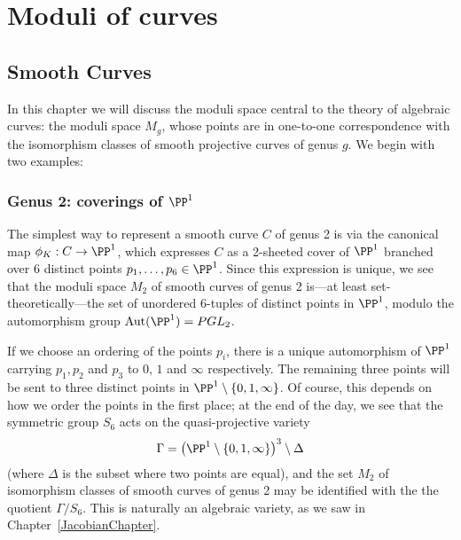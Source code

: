 


\chapter{Moduli of curves} 
\label{CurvesModuli chapter}\label{CurvesModuliChapter}

\section{Smooth Curves}

In this chapter we will discuss the moduli space central to the theory of algebraic curves: the moduli space $M_g$, whose points are in one-to-one correspondence with the isomorphism classes of smooth projective
curves of genus $g$. We begin with two examples:


\subsection{Genus 2: coverings of $\PP^1$}                                                                                             

 The simplest way to represent a smooth curve $C$ of genus 2 is via the canonical map $\phi_K : C \to \PP^1$, which expresses $C$ as a 2-sheeted cover of $\PP^1$ branched over 6 distinct points $p_1,\dots,p_6 \in \PP^1$. Since this expression is unique, we see that the moduli space $M_2$ of smooth curves of genus 2 is---at least set-theoretically---the set of unordered 6-tuples of distinct points in $\PP^1$, modulo the automorphism group ${\rm Aut}(\PP^1) = PGL_2$.

 If we choose an ordering of the points $p_i$, there is a unique automorphism of $\PP^1$ carrying $p_1, p_2$ and $p_3$ to $0$, $1$ and $\infty$ respectively.  The remaining three points will be sent to three distinct points in $\PP^1 \setminus \{0, 1, \infty \} $. Of course, this depends on how we order the points in the first place; at the end of the day, we see that the symmetric group $S_6$ acts on the quasi-projective variety
$$
\Gamma = \left( \PP^1 \setminus \{0, 1, \infty \} \right)^3 \setminus \Delta
$$
(where $\Delta$ is the subset where two points are equal), and the set $M_2$ of isomorphism classes of smooth curves of genus 2 may be identified with the the quotient $\Gamma/S_6$. This is naturally an algebraic variety, as we saw in Chapter~\ref{JacobianChapter}.

